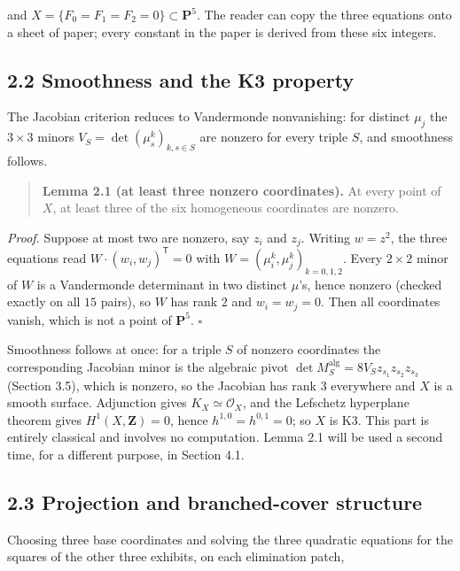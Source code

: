 and \(X = \{F_0 = F_1 = F_2 = 0\} \subset \mathbf{P}^5\). The reader can copy the three equations onto a sheet of paper; every constant in the paper is derived from these six integers.

\subsection{2.2 Smoothness and the K3 property}\label{smoothness-and-the-k3-property}

The Jacobian criterion reduces to Vandermonde nonvanishing: for distinct \(\mu_j\) the \(3 \times 3\) minors \(V_S = \det(\mu_s^k)_{k, s \in S}\) are nonzero for every triple \(S\), and smoothness follows.

\begin{quote}
\textbf{Lemma 2.1 (at least three nonzero coordinates).} At every point of \(X\), at least three of the six homogeneous coordinates are nonzero.
\end{quote}

\emph{Proof.} Suppose at most two are nonzero, say \(z_i\) and \(z_j\). Writing \(w = z^2\), the three equations read \(W \cdot (w_i, w_j)^{\mathsf T} = 0\) with \(W = (\mu_i^k, \mu_j^k)_{k=0,1,2}\). Every \(2 \times 2\) minor of \(W\) is a Vandermonde determinant in two distinct \(\mu\)'s, hence nonzero (checked exactly on all \(15\) pairs), so \(W\) has rank \(2\) and \(w_i = w_j = 0\). Then all coordinates vanish, which is not a point of \(\mathbf{P}^5\). \(\square\)

Smoothness follows at once: for a triple \(S\) of nonzero coordinates the corresponding Jacobian minor is the algebraic pivot \(\det M_S^{\mathrm{alg}} = 8 V_S z_{s_1} z_{s_2} z_{s_3}\) (Section 3.5), which is nonzero, so the Jacobian has rank \(3\) everywhere and \(X\) is a smooth surface. Adjunction gives \(K_X \simeq \mathcal{O}_X\), and the Lefschetz hyperplane theorem gives \(H^1(X, \mathbf{Z}) = 0\), hence \(h^{1,0} = h^{0,1} = 0\); so \(X\) is K3. This part is entirely classical and involves no computation. Lemma 2.1 will be used a second time, for a different purpose, in Section 4.1.

\subsection{2.3 Projection and branched-cover structure}\label{projection-and-branched-cover-structure}

Choosing three base coordinates and solving the three quadratic equations for the squares of the other three exhibits, on each elimination patch,

